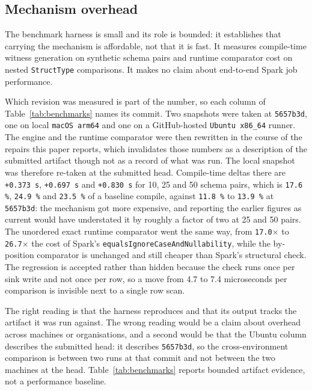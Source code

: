 \subsection{Mechanism overhead}

The benchmark harness is small and its role is bounded: it establishes that carrying the mechanism is affordable, not that it is fast. It measures compile-time witness generation on synthetic schema pairs and runtime comparator cost on nested \texttt{StructType} comparisons. It makes no claim about end-to-end Spark job performance.

Which revision was measured is part of the number, so each column of Table~\ref{tab:benchmarks} names its commit. Two snapshots were taken at \texttt{5657b3d}, one on local \texttt{macOS arm64} and one on a GitHub-hosted \texttt{Ubuntu x86\_64} runner. The engine and the runtime comparator were then rewritten in the course of the repairs this paper reports, which invalidates those numbers as a description of the submitted artifact though not as a record of what was run. The local snapshot was therefore re-taken at the submitted head. Compile-time deltas there are \texttt{+0.373\,s}, \texttt{+0.697\,s} and \texttt{+0.830\,s} for 10, 25 and 50 schema pairs, which is \texttt{17.6\,\%}, \texttt{24.9\,\%} and \texttt{23.5\,\%} of a baseline compile, against \texttt{11.8\,\%} to \texttt{13.9\,\%} at \texttt{5657b3d}: the mechanism got more expensive, and reporting the earlier figures as current would have understated it by roughly a factor of two at 25 and 50 pairs. The unordered exact runtime comparator went the same way, from \texttt{17.0$\times$} to \texttt{26.7$\times$} the cost of Spark's \texttt{equalsIgnoreCaseAndNullability}, while the by-position comparator is unchanged and still cheaper than Spark's structural check. The regression is accepted rather than hidden because the check runs once per sink write and not once per row, so a move from 4.7 to 7.4 microseconds per comparison is invisible next to a single row scan.

The right reading is that the harness reproduces and that its output tracks the artifact it was run against. The wrong reading would be a claim about overhead across machines or organisations, and a second would be that the Ubuntu column describes the submitted head: it describes \texttt{5657b3d}, so the cross-environment comparison is between two runs at that commit and not between the two machines at the head. Table~\ref{tab:benchmarks} reports bounded artifact evidence, not a performance baseline.

